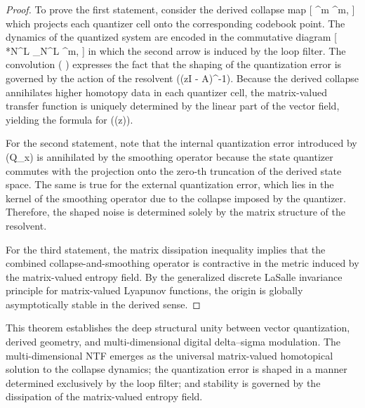\begin{proof}
To prove the first statement, consider the derived collapse map
[
^m  \Lambda \xrightarrow{\iota} ^m,
]
which projects each quantizer cell onto the corresponding codebook point. The dynamics of the quantized system are encoded in the commutative diagram
[
*N^L  \Lambda \to {}_N^L \to {}^m,
]
in which the second arrow is induced by the loop filter. The convolution ( \star {}) expresses the fact that the shaping of the quantization error is governed by the action of the resolvent ((zI - A)^{-1}). Because the derived collapse annihilates higher homotopy data in each quantizer cell, the matrix-valued transfer function is uniquely determined by the linear part of the vector field, yielding the formula for ((z)).

For the second statement, note that the internal quantization error introduced by (Q_x) is annihilated by the smoothing operator because the state quantizer commutes with the projection onto the zero-th truncation of the derived state space. The same is true for the external quantization error, which lies in the kernel of the smoothing operator due to the collapse imposed by the quantizer. Therefore, the shaped noise is determined solely by the matrix structure of the resolvent.

For the third statement, the matrix dissipation inequality implies that the combined collapse-and-smoothing operator is contractive in the metric induced by the matrix-valued entropy field. By the generalized discrete LaSalle invariance principle for matrix-valued Lyapunov functions, the origin is globally asymptotically stable in the derived sense.
\end{proof}

This theorem establishes the deep structural unity between vector quantization, derived geometry, and multi-dimensional digital delta--sigma modulation. The multi-dimensional NTF emerges as the universal matrix-valued homotopical solution to the collapse dynamics; the quantization error is shaped in a manner determined exclusively by the loop filter; and stability is governed by the dissipation of the matrix-valued entropy field.


\medskip

